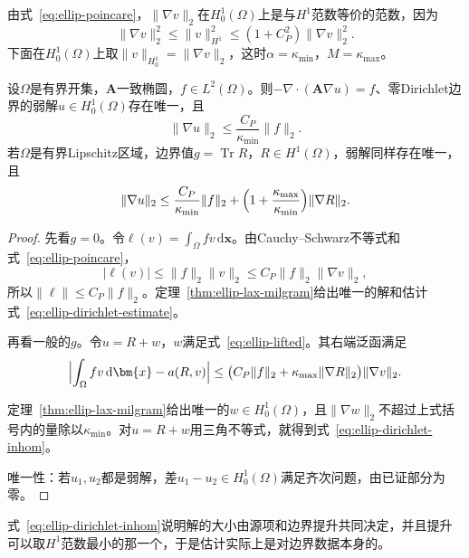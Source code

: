 由式~\eqref{eq:ellip-poincare}，$\lVert\nabla v\rVert_2$在$H^1_0(\Omega)$上是与$H^1$范数等价的范数，因为
\[
 \lVert\nabla v\rVert_2^2\leq\lVert v\rVert_{H^1}^2\leq(1+C_P^2)\lVert\nabla v\rVert_2^2 .
\]
下面在$H^1_0(\Omega)$上取$\lVert v\rVert_{H^1_0}=\lVert\nabla v\rVert_2$，这时$\alpha=\kappa_{\min}$，$M=\kappa_{\max}$。

\begin{theorem}[Dirichlet问题的适定性]
\label{thm:ellip-dirichlet}
设$\Omega$是有界开集，$\bm{A}$一致椭圆，$f\in L^2(\Omega)$。则$-\nabla\cdot(\bm{A}\nabla u)=f$、零Dirichlet边界的弱解$u\in H^1_0(\Omega)$存在唯一，且
\begin{equation}
 \lVert\nabla u\rVert_2\leq\frac{C_P}{\kappa_{\min}}\lVert f\rVert_2 .
 \label{eq:ellip-dirichlet-estimate}
\end{equation}
若$\Omega$是有界Lipschitz区域，边界值$g=\operatorname{Tr}R$，$R\in H^1(\Omega)$，弱解同样存在唯一，且
\begin{equation}
 \lVert\nabla u\rVert_2\leq\frac{C_P}{\kappa_{\min}}\lVert f\rVert_2+\Bigl(1+\frac{\kappa_{\max}}{\kappa_{\min}}\Bigr)\lVert\nabla R\rVert_2 .
 \label{eq:ellip-dirichlet-inhom}
\end{equation}
\end{theorem}

\begin{proof}
先看$g=0$。令$\ell(v)=\int_\Omega fv\,\mathrm{d}\bm{x}$。由Cauchy--Schwarz不等式和式~\eqref{eq:ellip-poincare}，
\[
 \lvert\ell(v)\rvert\leq\lVert f\rVert_2\lVert v\rVert_2\leq C_P\lVert f\rVert_2\lVert\nabla v\rVert_2 ,
\]
所以$\lVert\ell\rVert\leq C_P\lVert f\rVert_2$。定理~\ref{thm:ellip-lax-milgram}给出唯一的解和估计式~\eqref{eq:ellip-dirichlet-estimate}。

再看一般的$g$。令$u=R+w$，$w$满足式~\eqref{eq:ellip-lifted}。其右端泛函满足
\[
 \Bigl\lvert\int_\Omega fv\,\mathrm{d}\bm{x}-a(R,v)\Bigr\rvert\leq\bigl(C_P\lVert f\rVert_2+\kappa_{\max}\lVert\nabla R\rVert_2\bigr)\lVert\nabla v\rVert_2 .
\]

定理~\ref{thm:ellip-lax-milgram}给出唯一的$w\in H^1_0(\Omega)$，且$\lVert\nabla w\rVert_2$不超过上式括号内的量除以$\kappa_{\min}$。对$u=R+w$用三角不等式，就得到式~\eqref{eq:ellip-dirichlet-inhom}。

唯一性：若$u_1,u_2$都是弱解，差$u_1-u_2\in H^1_0(\Omega)$满足齐次问题，由已证部分为零。
\end{proof}

式~\eqref{eq:ellip-dirichlet-inhom}说明解的大小由源项和边界提升共同决定，并且提升可以取$H^1$范数最小的那一个，于是估计实际上是对边界数据本身的。

